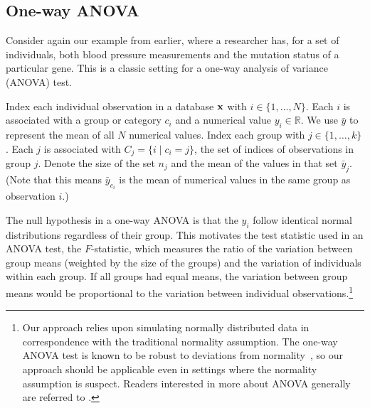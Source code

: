 \subsection{One-way ANOVA}

Consider again our example from earlier, where a researcher has, for a set of individuals, both blood pressure measurements and the mutation status of a particular gene.  This is a classic setting for a one-way analysis of variance (ANOVA) test.

Index each individual observation in a database $\mathbf{x}$ with $i \in \{1, \ldots, N\}$. Each $i$ is associated with a group or category $c_i$ and a numerical value $y_i \in \mathbb{R}$.  We use $\bar{y}$ to represent the mean of all $N$ numerical values. Index each group with $j \in \{1, \ldots, k\}$. Each $j$ is associated with $C_j = \{i \mid c_i=j\}$, the set of indices of observations in group $j$. Denote the size of the set $n_j$ and the mean of the values in that set $\bar{y}_j$.  (Note that this means $\bar{y}_{c_i}$ is the mean of numerical values in the same group as observation $i$.)

The null hypothesis in a one-way ANOVA is that the $y_i$ follow identical normal distributions regardless of their group. This motivates the test statistic used in an ANOVA test, the $F$-statistic, which measures the ratio of the variation between group means (weighted by the size of the groups) and the variation of individuals within each group. If all groups had equal means, the variation between group means would be proportional to the variation between individual observations.\footnote{Our approach relies upon simulating normally distributed data in correspondence with the traditional normality assumption. The one-way ANOVA test is known to be robust to deviations from normality~\cite{schmider2010}, so our approach should be applicable even in settings where the normality assumption is suspect. Readers interested in more about ANOVA generally are referred to \cite{cox1974theoretical}.}

